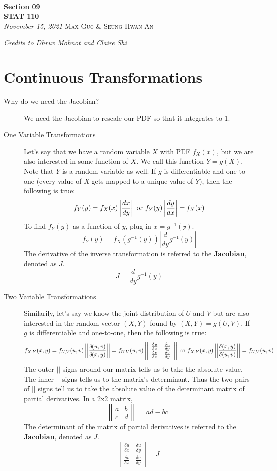 \documentclass[11pt]{article}
\theoremstyle{definition}
\theoremstyle{remark}
\newcommand{\inserttitle}{Section 09}
\newcommand{\insertauthor}{Max Guo \& Seung Hwan An}
\newcommand{\insertcourse}{STAT 110}
\begin{document}
{\noindent\Huge\bf  \\[0.1\baselineskip] {\inserttitle }}\\[2\baselineskip]
{{\bf \insertcourse}\\ {\textit{November 15, 2021}}} \hfill {\large \textsc{\insertauthor}}
\smallskip

\hfill \noindent \textit{Credits to Dhruv Mohnot and Claire Shi}


\section{Continuous Transformations}
\begin{description}
	\item[Why do we need the Jacobian?] We need the Jacobian to rescale our PDF so that it integrates to 1.
	\item[One Variable Transformations] Let's say that we have a random variable $X$ with PDF $f_X(x)$, but we are also interested in some function of $X$. We call this function $Y = g(X)$. Note that $Y$ is a random variable as well. If $g$ is differentiable and one-to-one (every value of $X$ gets mapped to a unique value of $Y$), then the following is true:
	\[f_Y(y) = f_X(x)\left|\frac{dx}{dy}\right| \textnormal{ or } f_Y(y) \left|\frac{dy}{dx}\right|= f_X(x)\]
	To find $f_Y(y)$ as a function of $y$, plug in $x = g^{-1}(y)$.
	\[f_Y(y) = f_X(g^{-1}(y))\left|\frac{d}{dy}g^{-1}(y)\right|\]
	The derivative of the inverse transformation is referred to the \textbf{Jacobian}, denoted as $J$.
	\[J = \frac{d}{dy}g^{-1}(y)\]
	\item[Two Variable Transformations] Similarily, let's say we know the joint distribution of $U$ and $V$ but are also interested in the random vector $(X, Y)$ found by $(X, Y) = g(U, V)$. If $g$ is differentiable and one-to-one, then the following is true:
	\[f_{X,Y}(x, y) = f_{U,V}(u,v) \left|\left| \frac{\delta(u, v)}{\delta(x, y)} \right|\right| = f_{U,V}(u,v)\left| \left| 
	\begin{array}{ccc}
		\frac{\delta u}{\delta x} & \frac{\delta u}{\delta y} \\
		\frac{\delta v}{\delta x} & \frac{\delta v}{\delta y} 
	\end{array}
	\right| \right| \textnormal{ or } f_{X,Y}(x, y) \left|\left| \frac{\delta(x, y)}{\delta(u, v)} \right|\right| = f_{U,V}(u,v) 
	\]
	The outer $||$ signs around our matrix tells us to take the absolute value. The inner $||$ signs tells us to the matrix's determinant. Thus the two pairs of $||$ signs tell us to take the absolute value of the determinant matrix of partial derivatives. In a 2x2 matrix, 
	\[ \left| \left|
	\begin{array}{ccc}
		a & b \\
		c & d
	\end{array}
	\right| \right| = |ad - bc|\]
	The determinant of the matrix of partial derivatives is referred to the \textbf{Jacobian}, denoted as $J$.
	\[\left| \begin{array}{ccc}
		\frac{\delta u}{\delta x} & \frac{\delta u}{\delta y} \\
		\frac{\delta v}{\delta x} & \frac{\delta v}{\delta y} 
	\end{array}\right| = J\]


\end{description}
\end{document}
